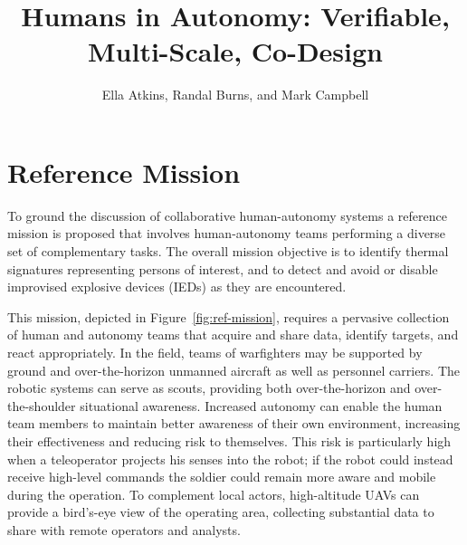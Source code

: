 \documentclass[11pt]{article}
\begin{document}
\title{Humans in Autonomy: Verifiable, Multi-Scale, Co-Design}

\author{Ella Atkins, Randal Burns, and Mark Campbell}

\maketitle
\thispagestyle{empty}














%
\section*{Reference Mission}

To ground the discussion of collaborative human-autonomy systems a reference mission is proposed
that involves human-autonomy teams performing a diverse set of complementary tasks.  The overall
mission objective is to identify thermal signatures representing persons of interest, and to detect and avoid
or disable improvised explosive devices (IEDs) as they are encountered.

This mission, depicted in Figure~\ref{fig:ref-mission}, requires a pervasive collection of human and autonomy teams that
acquire and share data, identify targets, and react appropriately.  In the field, teams of warfighters may be supported by ground and over-the-horizon unmanned aircraft as well as personnel carriers.  The robotic systems can serve as scouts, providing both over-the-horizon and over-the-shoulder situational awareness.  Increased autonomy can enable the human team members to maintain better awareness of their own environment, increasing their effectiveness and reducing risk to themselves.  This risk is particularly high when a teleoperator projects his senses into the robot; if the robot could instead receive high-level commands the soldier could remain more aware and mobile during the operation.  To complement local actors, high-altitude UAVs can provide a bird's-eye view of the operating area, collecting substantial data to share with remote operators and analysts.
\end{document}
